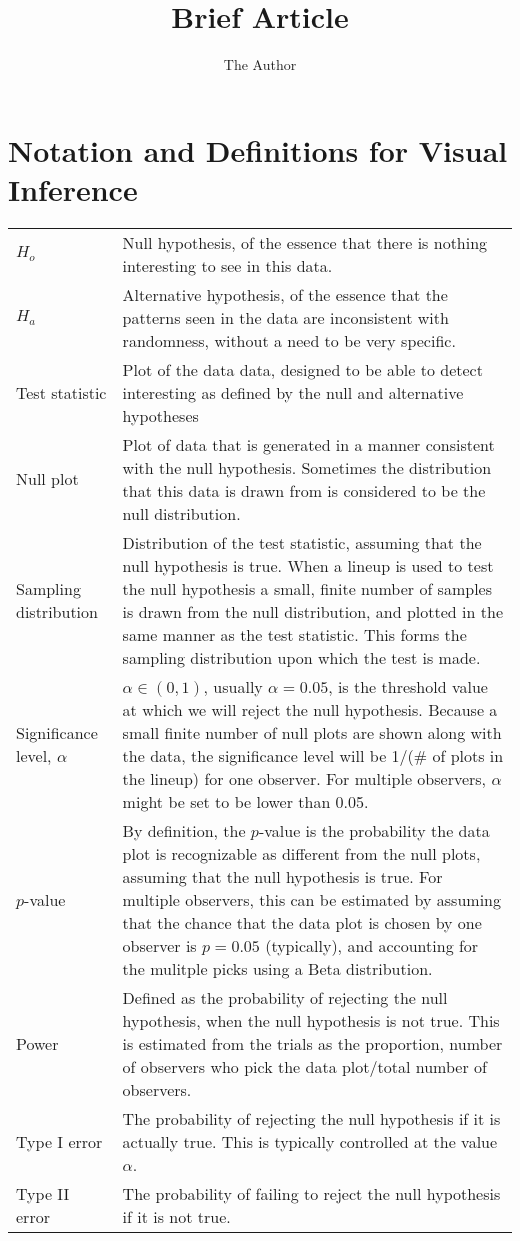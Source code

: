\documentclass[11pt]{article}
\title{Brief Article}
\author{The Author}
\begin{document}
\section{Notation and Definitions for Visual Inference}


\begin{tabular}{lp{4in}}
$H_o$ & Null hypothesis, of the essence that there is nothing interesting to see in this data. \\
$H_a$ & Alternative hypothesis, of the essence that the patterns seen in the data are inconsistent with randomness, without a need to be very specific. \\
Test statistic & Plot of the data data, designed to be able to detect interesting as defined by the null and alternative hypotheses\\
Null plot & Plot of data that is generated in a manner consistent with the null hypothesis. Sometimes the distribution that this data is drawn from is considered to be the null distribution. \\
Sampling distribution & Distribution of the test statistic, assuming that the null hypothesis is true. When a lineup is used to test the null hypothesis a small, finite number of samples is drawn from the null distribution, and plotted in the same manner as the test statistic. This forms the sampling distribution upon which the test is made.  \\
Significance level, $\alpha$ & $\alpha \in (0,1)$, usually $\alpha=0.05$, is the threshold value at which we will reject the null hypothesis. Because a small finite number of null plots are shown along with the data, the significance level will be 1/(\# of plots in the lineup) for one observer. For multiple observers, $\alpha$ might be set to be lower than 0.05. \\
$p$-value & By definition, the $p$-value is the probability the data plot is recognizable as different from the null plots, assuming that the null hypothesis is true. For multiple observers, this can be estimated by assuming that the chance that the data plot is chosen by one observer is $p=0.05$ (typically), and accounting for the mulitple picks using a Beta distribution. \\
Power & Defined as the probability of rejecting the null hypothesis, when the null hypothesis is not true. This is estimated from the trials as the proportion, number of observers who pick the data plot/total number of observers. \\
Type I error & The probability of rejecting the null hypothesis if it is actually true. This is typically controlled at the value $\alpha$. \\
Type II error & The probability of failing to reject the null hypothesis if it is not true.\\
\end{tabular}
\end{document}
